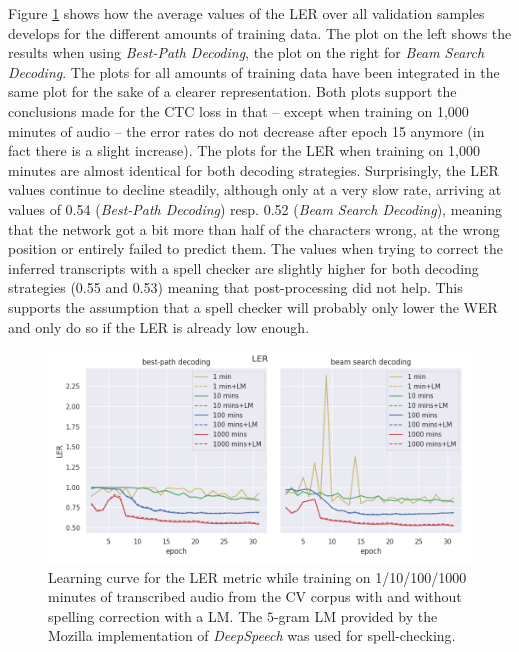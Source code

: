 Figure \ref{lc_ler_cv} shows how the average values of the \ac{LER} over all validation samples develops for the different amounts of training data. The plot on the left shows the results when using \textit{Best-Path Decoding}, the plot on the right for \textit{Beam Search Decoding}. The plots for all amounts of training data have been integrated in the same plot for the sake of a clearer representation. Both plots support the conclusions made for the CTC loss in that -- except when training on 1,000 minutes of audio -- the error rates do not decrease after epoch 15 anymore (in fact there is a slight increase). The plots for the \ac{LER} when training on 1,000 minutes are almost identical for both decoding strategies. Surprisingly, the \ac{LER} values continue to decline steadily, although only at a very slow rate, arriving at values of 0.54 (\textit{Best-Path Decoding}) resp. 0.52 (\textit{Beam Search Decoding}), meaning that the network got a bit more than half of the characters wrong, at the wrong position or entirely failed to predict them. The values when trying to correct the inferred transcripts with a spell checker are slightly higher for both decoding strategies (0.55 and 0.53) meaning that post-processing did not help. This supports the assumption that a spell checker will probably only lower the \ac{WER} and only do so if the \ac{LER} is already low enough.

\begin{figure}[h!]
	\includegraphics[width=\linewidth]{./img/lc_ler_cv.png}
	\caption{Learning curve for the \ac{LER} metric while training on 1/10/100/1000 minutes of transcribed audio from the \ac{CV} corpus with and without spelling correction with a \ac{LM}. The $5$-gram \ac{LM} provided by the Mozilla implementation of \textit{DeepSpeech} was used for spell-checking.}
	\label{lc_ler_cv}
\end{figure}

